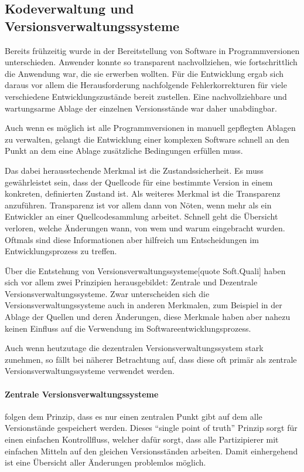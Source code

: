 \subsection{Kodeverwaltung und Versionsverwaltungssysteme}

Bereits frühzeitig wurde in der Bereitstellung von Software in Programmversionen unterschieden. Anwender konnte so transparent nachvollziehen, wie fortschrittlich die Anwendung war, die sie erwerben wollten.
Für die Entwicklung ergab sich daraus vor allem die Herausforderung nachfolgende Fehlerkorrekturen für viele verschiedene Entwicklungszustände bereit zustellen.
Eine nachvollziehbare und wartungsarme Ablage der einzelnen Versionsstände war daher unabdingbar.

Auch wenn es möglich ist alle Programmversionen in manuell gepflegten Ablagen zu verwalten, gelangt die Entwicklung einer komplexen Software schnell an den Punkt an dem eine Ablage zusätzliche Bedingungen erfüllen muss.

Das dabei herausstechende Merkmal ist die Zustandssicherheit. Es muss gewährleistet sein, dass der Quellcode für eine bestimmte Version in einem konkreten, definierten Zustand ist. Als weiteres Merkmal ist die Transparenz anzuführen. Transparenz ist vor allem dann von Nöten, wenn mehr als ein Entwickler an einer Quellcodesammlung arbeitet. Schnell geht die Übersicht verloren, welche Änderungen wann, von wem und warum eingebracht wurden. Oftmals sind diese Informationen aber hilfreich um Entscheidungen im Entwicklungsprozess zu treffen.

Über die Entstehung von Versionsverwaltungssysteme[quote Soft.Quali] haben sich vor allem zwei Prinzipien herausgebildet: Zentrale und Dezentrale Versionsverwaltungssysteme. Zwar unterscheiden sich die Versionsverwaltungssysteme auch in anderen Merkmalen, zum Beispiel in der Ablage der Quellen und deren Änderungen, diese Merkmale haben aber nahezu keinen Einfluss auf die Verwendung im Softwareentwicklungsprozess.

Auch wenn heutzutage die dezentralen Versionsverwaltungssystem stark zunehmen, so fällt bei näherer Betrachtung auf, dass diese oft primär als zentrale Versionsverwaltungssysteme verwendet werden.

\paragraph{Zentrale Versionsverwaltungssysteme} folgen dem Prinzip, dass es nur einen zentralen Punkt gibt auf dem alle Versionstände gespeichert werden. Dieses ``single point of truth'' Prinzip sorgt für einen einfachen Kontrollfluss, welcher dafür sorgt, dass alle Partizipierer mit einfachen Mitteln auf den gleichen Versionsständen arbeiten. Damit einhergehend ist eine Übersicht aller Änderungen problemlos möglich.

